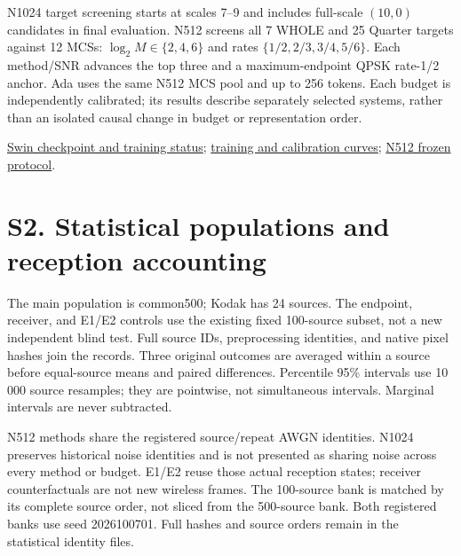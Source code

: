 \documentclass[11pt,letterpaper]{article}
\begin{document}
N1024 target screening starts at scales 7--9 and includes full-scale $(10,0)$ candidates in final evaluation. N512 screens all 7 WHOLE and 25 Quarter targets against 12 MCSs: $\log_2 M\in\{2,4,6\}$ and rates $\{1/2,2/3,3/4,5/6\}$. Each method/SNR advances the top three and a maximum-endpoint QPSK rate-1/2 anchor. Ada uses the same N512 MCS pool and up to 256 tokens. Each budget is independently calibrated; its results describe separately selected systems, rather than an isolated causal change in budget or representation order.

\href{https://github.com/daiqizai/var-comm/blob/2c303b615f73edd0a7a971308c0df8bd5bb885d0/results/baseline_strength_20261011/Swin_1to19/selected_checkpoint.json}{Swin checkpoint and training status}; \href{https://github.com/daiqizai/var-comm/blob/2c303b615f73edd0a7a971308c0df8bd5bb885d0/results/baseline_strength_20261011/training_figures_v1/training_calibration_curves.pdf}{training and calibration curves}; \href{https://github.com/daiqizai/var-comm/blob/2c303b615f73edd0a7a971308c0df8bd5bb885d0/results/nestcom_n512_20261028_v1/protocol.json}{N512 frozen protocol}.

\clearpage\section*{S2. Statistical populations and reception accounting}
The main population is common500; Kodak has 24 sources. The endpoint, receiver, and E1/E2 controls use the existing fixed 100-source subset, not a new independent blind test. Full source IDs, preprocessing identities, and native pixel hashes join the records. Three original outcomes are averaged within a source before equal-source means and paired differences. Percentile 95\% intervals use 10\,000 source resamples; they are pointwise, not simultaneous intervals. Marginal intervals are never subtracted.

N512 methods share the registered source/repeat AWGN identities. N1024 preserves historical noise identities and is not presented as sharing noise across every method or budget. E1/E2 reuse those actual reception states; receiver counterfactuals are not new wireless frames. The 100-source bank is matched by its complete source order, not sliced from the 500-source bank. Both registered banks use seed 2026100701. Full hashes and source orders remain in the statistical identity files.
\end{document}

